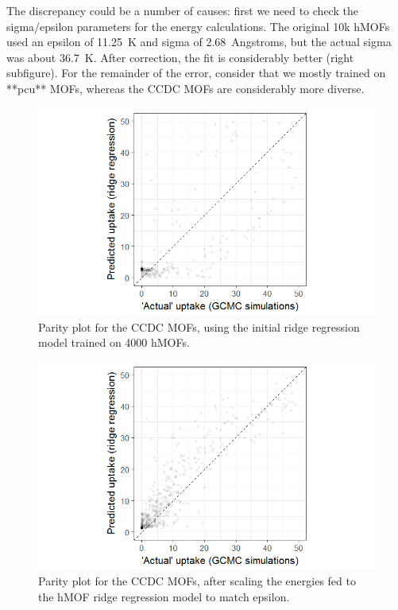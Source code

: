 \documentclass[letterpaper]{article}
\begin{document}
The discrepancy could be a number of causes: first we need to check the sigma/epsilon parameters for the energy calculations.  The original 10k hMOFs used an epsilon of 11.25~K and sigma of 2.68~Angstroms, but the actual sigma was about 36.7~K.  After correction, the fit is considerably better (right subfigure).  For the remainder of the error, consider that we mostly trained on **pcu** MOFs, whereas the CCDC MOFs are considerably more diverse.

\begin{figure}[H]
	\centering
	\includegraphics[width=0.75\columnwidth]{Figs/initial_ccdc.png}
	\caption{Parity plot for the CCDC MOFs, using the initial ridge regression model trained on 4000 hMOFs.}
	\label{fig:init_ccdc_parity}
\end{figure}

\begin{figure}[H]
	\centering
	\includegraphics[width=0.75\columnwidth]{Figs/initial_ccdc_scaled_hmof.png}
	\caption{Parity plot for the CCDC MOFs, after scaling the energies fed to the hMOF ridge regression model to match epsilon.}
	\label{fig:init_ccdc_parity}
\end{figure}
\end{document}
